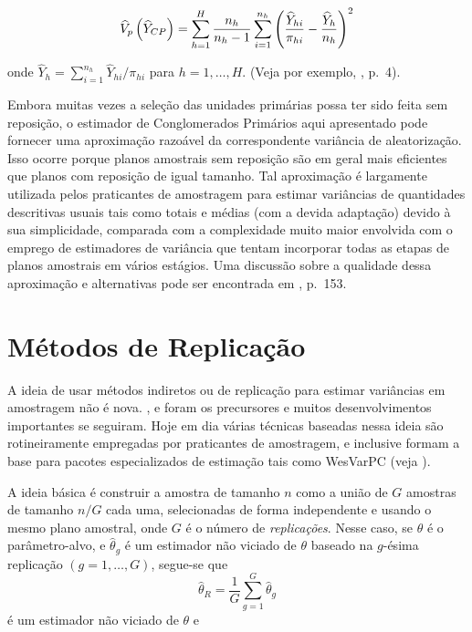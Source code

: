 \documentclass[]{book}
\numberwithin{example}{chapter}
\numberwithin{remark}{chapter}
\numberwithin{definition}{chapter}
\begin{document}
\begin{equation}
\widehat{V}_{p}\left( \widehat{Y}_{CP}\right) =\sum_{h=1}^{H}\frac{n_{h}}{%
n_{h}-1}\sum_{i=1}^{n_{h}}\left( \frac{\widehat{Y}_{hi}}{\pi _{hi}}-\frac{%
\widehat{Y}_{h}}{n_{h}}\right) ^{2}  \label{eq:estpa23}
\end{equation}

onde \(\widehat{Y}_{h}=\sum_{i=1}^{n_{h}}\widehat{Y}_{hi}/\pi _{hi}\)
para \(h=1,\ldots ,H\). (Veja por exemplo, \citep{Sudaan93}, p.~4).

Embora muitas vezes a seleção das unidades primárias possa ter sido
feita sem reposição, o estimador de Conglomerados Primários aqui
apresentado pode fornecer uma aproximação razoável da correspondente
variância de aleatorização. Isso ocorre porque planos amostrais sem
reposição são em geral mais eficientes que planos com reposição de igual
tamanho. Tal aproximação é largamente utilizada pelos praticantes de
amostragem para estimar variâncias de quantidades descritivas usuais
tais como totais e médias (com a devida adaptação) devido à sua
simplicidade, comparada com a complexidade muito maior envolvida com o
emprego de estimadores de variância que tentam incorporar todas as
etapas de planos amostrais em vários estágios. Uma discussão sobre a
qualidade dessa aproximação e alternativas pode ser encontrada em
\citep{SSW92}, p.~153.

\section{Métodos de Replicação}\label{metodos-de-replicacao}

A ideia de usar métodos indiretos ou de replicação para estimar
variâncias em amostragem não é nova. \citep{Mahala39}, \citep{Mahala44}
e \citep{deming} foram os precursores e muitos desenvolvimentos
importantes se seguiram. Hoje em dia várias técnicas baseadas nessa
ideia são rotineiramente empregadas por praticantes de amostragem, e
inclusive formam a base para pacotes especializados de estimação tais
como WesVarPC (veja \citep{Westat}).

A ideia básica é construir a amostra de tamanho \(n\) como a união de
\(G\) amostras de tamanho \(n/G\) cada uma, selecionadas de forma
independente e usando o mesmo plano amostral, onde \(G\) é o número de
\emph{replicações}. Nesse caso, se \(\theta\) é o parâmetro-alvo, e
\(\widehat{\theta}_{g}\) é um estimador não viciado de \(\theta\)
baseado na \(g\)-ésima replicação \((g=1,\ldots ,G)\), segue-se que \[
\widehat{\theta }_{R}=\frac{1}{G}\sum_{g=1}^{G}\widehat{\theta }_{g} 
\] é um estimador não viciado de \(\theta\) e
\end{document}
